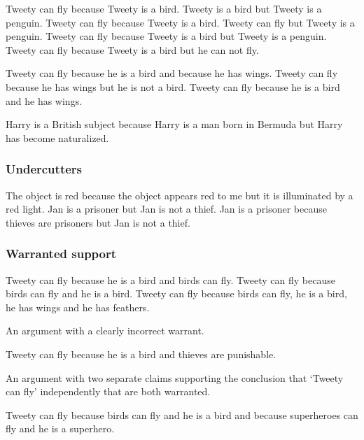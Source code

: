 \begin{exe}
\ex\label{e30} Tweety can fly because Tweety is a bird. Tweety is a bird but Tweety is a penguin.
\ex\label{e31} Tweety can fly because Tweety is a bird. Tweety can fly but Tweety is a penguin.
\ex\label{e32} Tweety can fly because Tweety is a bird but Tweety is a penguin.
\ex\label{e33} Tweety can fly because Tweety is a bird but he can not fly.
\end{exe}

\begin{exe}
\ex\label{e34} Tweety can fly because he is a bird and because he has wings.
\ex\label{e35} Tweety can fly because he has wings but he is not a bird.
\ex\label{e36} Tweety can fly because he is a bird and he has wings.
\end{exe}

\begin{exe}
\ex\label{e37} Harry is a British subject because Harry is a man born in Bermuda but Harry has become naturalized.
\end{exe}

\subsubsection{Undercutters}
\begin{exe}
\ex\label{e38} The object is red because the object appears red to me but it is illuminated by a red light.
\ex\label{e39} Jan is a prisoner but Jan is not a thief.
\ex\label{e40} Jan is a prisoner because thieves are prisoners but Jan is not a thief.
\end{exe}

\subsubsection{Warranted support}
\begin{exe}
\ex\label{e41} Tweety can fly because he is a bird and birds can fly.
\ex\label{e42} Tweety can fly because birds can fly and he is a bird.
\ex\label{e43} Tweety can fly because birds can fly, he is a bird, he has wings and he has feathers.
\end{exe}

\noindent An argument with a clearly incorrect warrant.
\begin{exe}
\ex\label{e44} Tweety can fly because he is a bird and thieves are punishable.
\end{exe}

\noindent An argument with two separate claims supporting the conclusion that `Tweety can fly' independently that are both warranted.
\begin{exe}
\ex\label{e45} Tweety can fly because birds can fly and he is a bird and because superheroes can fly and he is a superhero.
\end{exe}

